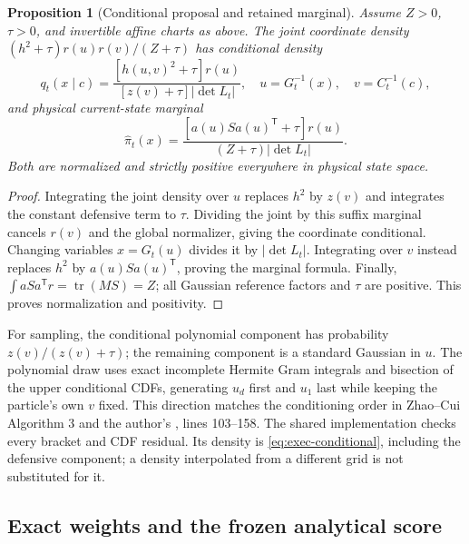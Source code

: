 \documentclass[11pt]{article}
\newtheorem{proposition}{Proposition}
\begin{document}
\begin{proposition}[Conditional proposal and retained marginal]
\label{prop:exec-conditionals}
Assume $Z>0$, $\tau>0$, and invertible affine charts as above. The joint
coordinate density $(h^2+\tau)r(u)r(v)/(Z+\tau)$ has conditional density
\begin{equation}
 q_t(x\mid c)=\frac{[h(u,v)^2+\tau]r(u)}{[z(v)+\tau]|\det L_t|},
 \quad u=G_t^{-1}(x),\quad v=C_t^{-1}(c),
 \label{eq:exec-conditional}
\end{equation}
and physical current-state marginal
\begin{equation}
 \widehat\pi_t(x)=\frac{[a(u)S a(u)^{\mathsf T}+\tau]r(u)}
 {(Z+\tau)|\det L_t|}.
 \label{eq:exec-marginal}
\end{equation}
Both are normalized and strictly positive everywhere in physical state space.
\end{proposition}
\begin{proof}
Integrating the joint density over $u$ replaces $h^2$ by $z(v)$ and
integrates the constant defensive term to $\tau$. Dividing the joint by this
suffix marginal cancels $r(v)$ and the global normalizer, giving the
coordinate conditional. Changing variables $x=G_t(u)$ divides it by
$|\det L_t|$. Integrating over $v$ instead replaces $h^2$ by
$a(u)S a(u)^{\mathsf T}$, proving the marginal formula. Finally,
$\int aSa^{\mathsf T}r=\operatorname{tr}(MS)=Z$; all Gaussian reference
factors and $\tau$ are positive. This proves normalization and positivity.
\end{proof}

For sampling, the conditional polynomial component has probability
$z(v)/(z(v)+\tau)$; the remaining component is a standard Gaussian in $u$.
The polynomial draw uses exact incomplete Hermite Gram integrals and
bisection of the upper conditional CDFs, generating $u_d$ first and $u_1$
last while keeping the particle's own $v$ fixed. This direction matches the
conditioning order in Zhao--Cui Algorithm 3 and the author's
, lines 103--158. The shared implementation
checks every bracket and CDF residual. Its density is
\eqref{eq:exec-conditional}, including the defensive component; a density
interpolated from a different grid is not substituted for it.

\subsection{Exact weights and the frozen analytical score}
\end{document}
